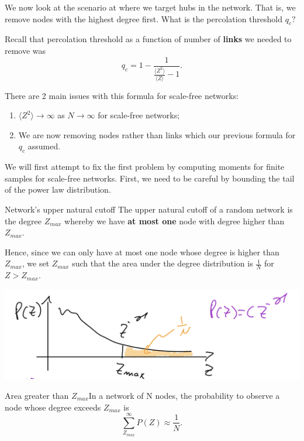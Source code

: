 \documentclass[twoside]{article}
\begin{document}
We now look at the scenario at where we target hubs in the network. That is, we remove nodes with the highest degree first. What is the percolation threshold $q_c?$

Recall that percolation threshold as a function of number of \textbf{links} we needed to remove was
$$
q_c = 1 - \frac{1}{\frac{\langle Z^2 \rangle}{\langle Z \rangle} - 1}.
$$


There are 2 main issues with this formula for scale-free networks:
\begin{enumerate}
\item $\langle Z^2 \rangle \rightarrow \infty$ as $N \rightarrow \infty$ for scale-free networks;
\item We are now removing nodes rather than links which our previous formula for $q_c$ assumed.
\end{enumerate}

We will first attempt to fix the first problem by computing moments for finite samples for scale-free networks. First, we need to be careful by bounding the tail of the power law distribution.

\begin{definition_exam}{Network's upper natural cutoff}{} The upper natural cutoff of a random network is the degree $Z_{max}$ whereby we have \textbf{at most one} node with degree higher than $Z_{max}.$
\end{definition_exam}

Hence, since we can only have at most one node whose degree is higher than $Z_{max}$, we set $Z_{max}$ such that the area under the degree distribution is $\frac{1}{N}$ for $Z > Z_{max}$. 


\begin{center}
\includegraphics[scale=0.4]{Scale-free-tail}
\end{center}

\begin{proposition_exam}{Area greater than $Z_{max}$}{}In a network of N nodes, the probability to observe a node whose degree exceeds $Z_{max}$ is 
$$
\sum_{Z_{max}}^{\infty}P(Z) \approx \frac{1}{N}.
$$
\end{proposition_exam}
\end{document}
